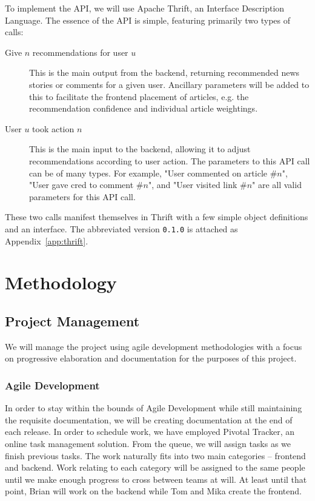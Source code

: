 \documentclass[11pt,letterpaper]{article}
\begin{document}
To implement the API, we will use Apache Thrift, an Interface Description Language\cite{thrift}.
The essence of the API is simple, featuring primarily two types of calls:
\begin{description}
\item[Give $n$ recommendations for user $u$]
This is the main output from the backend, returning recommended news stories or comments for a given user.
Ancillary parameters will be added to this to facilitate the frontend placement of articles, e.g. the recommendation confidence and individual article weightings.
\item[User $u$ took action $n$]
This is the main input to the backend, allowing it to adjust recommendations according to user action.
The parameters to this API call can be of many types. For example, "User commented on article \#$n$", "User gave cred to comment \#$n$", and "User visited link \#$n$" are all valid parameters for this API call.
\end{description}

These two calls manifest themselves in Thrift with a few simple object
definitions and an interface.  The abbreviated version \texttt{0.1.0} is
attached as Appendix~\ref{app:thrift}.

\section{Methodology}

\subsection{Project Management}
We will manage the project using agile development methodologies with a focus on progressive elaboration and documentation for the purposes of this project.

\subsubsection{Agile Development}
In order to stay within the bounds of Agile Development while still maintaining the requisite documentation, we will be creating documentation at the end of each release.
In order to schedule work, we have employed Pivotal Tracker, an online task management solution.
From the queue, we will assign tasks as we finish previous tasks.
The work naturally fits into two main categories -- frontend and backend.
Work relating to each category will be assigned to the same people until we make enough progress to cross between teams at will.
At least until that point, Brian will work on the backend while Tom and Mika create the frontend.
\end{document}
